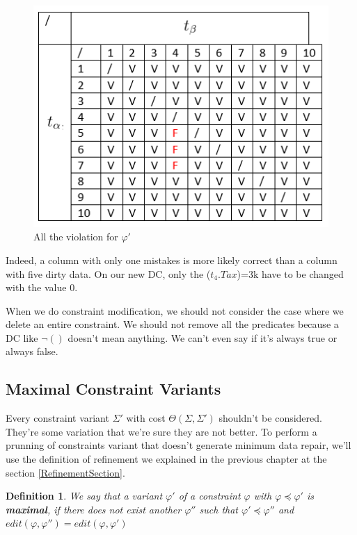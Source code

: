 \documentclass[letterpaper, 12pt]{report}
\newtheorem{mydef}{Definition}
\begin{document}
\begin{figure}
	\centering
	\includegraphics[scale=1]{img/TaxGood}
	\caption{\label{GoodTax} All the violation for $\varphi '$}
\end{figure}

Indeed, a column with only one mistakes is more likely correct than a column with five dirty data. On our new DC, only the ($t_4.Tax$)=3k have to be changed with the value 0.

When we do constraint modification, we should not consider the case where we delete an entire constraint.  We should not remove all the predicates because a DC like $\neg()$ doesn't mean anything. We can't even say if it's always true or always false.

\subsection{Maximal Constraint Variants}

	Every constraint variant $\Sigma'$ with cost $\Theta(\Sigma,\Sigma')$ shouldn't be considered. They're some variation that we're sure they are not better. To perform a prunning of constraints variant that doesn't generate minimum data repair, we'll use the definition of refinement we explained in the previous chapter at the section \ref{RefinementSection}.
	
\begin{mydef}\cite{main}
 We say that a variant $\varphi '$ of a constraint $\varphi$ with $\varphi \preceq \varphi'$ is \textbf{maximal}, if there does not exist another $\varphi ''$ such that $\varphi ' \preceq \varphi ''$ and $edit(\varphi,\varphi'') = edit (\varphi,\varphi')$
\end{mydef}
\end{document}
